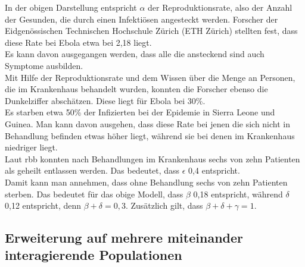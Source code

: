 In der obigen Darstellung entspricht $\alpha$ der Reproduktionsrate, also der Anzahl der Gesunden, die durch einen Infektiösen angesteckt werden. Forscher der Eidgenössischen Technischen Hochschule Zürich (ETH Zürich) stellten fest, dass diese Rate bei Ebola etwa bei 2,18 liegt.\\
Es kann davon ausgegangen werden, dass alle die ansteckend sind auch Symptome ausbilden.\\
Mit Hilfe der Reproduktionsrate und dem Wissen über die Menge an Personen, die im Krankenhaus behandelt wurden, konnten die Forscher ebenso die Dunkelziffer abschätzen. Diese liegt für Ebola bei 30\%.\\
Es starben etwa 50\% der Infizierten bei der Epidemie in Sierra Leone und Guinea. Man kann davon ausgehen, dass diese Rate bei jenen die sich nicht in Behandlung befinden etwas höher liegt, während sie bei denen im Krankenhaus niedriger liegt.\\
Laut rbb konnten nach Behandlungen im Krankenhaus sechs von zehn Patienten als geheilt entlassen werden. Das bedeutet, dass $\epsilon$ 0,4 entspricht. \\
Damit kann man annehmen, dass ohne Behandlung sechs von zehn Patienten sterben. Das bedeutet für das obige Modell, dass $\beta$ 0,18 entspricht, während $\delta$ 0,12 entspricht, denn $\beta + \delta = 0,3$. Zusätzlich gilt, dass $\beta + \delta + \gamma = 1$. \\
\subsection{Erweiterung auf mehrere miteinander interagierende Populationen}\label{ssec:multiPop}
\steffen

